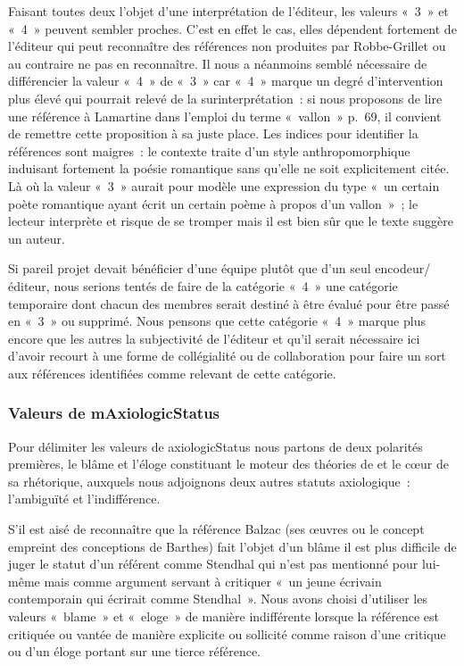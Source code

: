 Faisant toutes deux l'objet d'une interprétation de l'éditeur, les valeurs «~3~» et «~4~» peuvent sembler proches. C'est en effet le cas, elles dépendent fortement de l'éditeur qui peut reconnaître des références non produites par Robbe-Grillet ou au contraire ne pas en reconnaître. Il nous a néanmoins semblé nécessaire de différencier la valeur «~4~» de «~3~» car «~4~» marque un degré d'intervention plus élevé qui pourrait relevé de la surinterprétation~: si nous proposons de lire une référence à Lamartine dans l'emploi du terme «~vallon~» p.~69, il convient de remettre cette proposition à sa juste place. Les indices pour identifier la références sont maigres~: le contexte traite d'un style anthropomorphique induisant fortement la poésie romantique sans qu'elle ne soit explicitement citée. Là où la valeur «~3~» aurait pour modèle une expression du type «~un certain poète romantique ayant écrit un certain poème à propos d'un vallon~»~; le lecteur interprète et risque de se tromper mais il est bien sûr que le texte suggère un auteur. 

Si pareil projet devait bénéficier d'une équipe plutôt que d'un seul encodeur/éditeur, nous serions tentés de faire de la catégorie «~4~» une catégorie temporaire dont chacun des membres serait destiné à être évalué pour être passé en «~3~» ou supprimé. Nous pensons que cette catégorie «~4~» marque plus encore que les autres la subjectivité de l'éditeur et qu'il serait nécessaire ici d'avoir recourt à une forme de collégialité ou de collaboration pour faire un sort aux références identifiées comme relevant de cette catégorie.



\subsubsection{Valeurs de mAxiologicStatus}
Pour délimiter les valeurs de axiologicStatus nous partons de deux polarités premières, le blâme et l'éloge constituant le moteur des théories de \robbe{} et le cœur de sa rhétorique, auxquels nous adjoignons deux autres statuts axiologique~: l'ambiguïté et l'indifférence. 

S'il est aisé de reconnaître que la référence Balzac (ses œuvres ou le concept empreint des conceptions de Barthes) fait l'objet d'un blâme il est plus difficile de juger le statut d'un référent comme Stendhal qui n'est pas mentionné pour lui-même mais comme argument servant à critiquer «~un jeune écrivain contemporain qui écrirait comme Stendhal~». Nous avons choisi d'utiliser les valeurs «~blame~» et «~eloge~» de manière indifférente lorsque la référence est critiquée ou vantée de manière explicite ou sollicité comme raison d'une critique ou d'un éloge portant sur une tierce référence.

